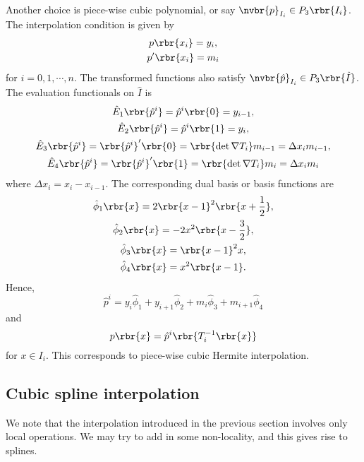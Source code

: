 \documentclass[english, nochinese]{pnote}
\begin{document}
Another choice is piece-wise cubic polynomial, or say $ \nvbr{p}_{I_i} \in P_3 \rbr{I_i} $. The interpolation condition is given by
\begin{gather}
p \rbr{x_i} = y_i, \\
p' \rbr{x_i} = m_i
\end{gather}
for $ i = 0, 1, \cdots, n $. The transformed functions also satisfy $ \nvbr{\hat{p}}_{I_i} \in P_3 \rbr{\hat{I}} $. The evaluation functionals on $\hat{I}$ is
\begin{gather}
\hat{E}_1 \rbr{\hat{p}^i} = \hat{p}^i \rbr{0} = y_{ i - 1 }, \\
\hat{E}_2 \rbr{\hat{p}^i} = \hat{p}^i \rbr{1} = y_i, \\
\hat{E}_3 \rbr{\hat{p}^i} = \rbr{\hat{p}^i}' \rbr{0} = \rbr{ \det \nabla T_i } m_{ i - 1 } = \Delta x_i m_{ i - 1 }, \\
\hat{E}_4 \rbr{\hat{p}^i} = \rbr{\hat{p}^i}' \rbr{1} = \rbr{ \det \nabla T_i } m_i = \Delta x_i m_i
\end{gather}
where $ \Delta x_i = x_i - x_{ i - 1 } $. The corresponding dual basis or basis functions are
\begin{gather}
\hat{\phi}_1 \rbr{x} = 2 \rbr{ x - 1 }^2 \rbr{ x + \frac{1}{2} }, \\
\hat{\phi}_2 \rbr{x} = -2 x^2 \rbr{ x - \frac{3}{2} }, \\
\hat{\phi}_3 \rbr{x} = \rbr{ x - 1 }^2 x, \\
\hat{\phi}_4 \rbr{x} = x^2 \rbr{ x - 1 }.
\end{gather}
Hence,
\begin{equation}
\hat{p}^i = y_i \hat{\phi}_1 + y_{ i + 1 } \hat{\phi}_2 + m_i \hat{\phi}_3 + m_{ i + 1 } \hat{\phi}_4
\end{equation}
and
\begin{equation}
p \rbr{x} = \hat{p}^i \rbr{T_i^{-1} \rbr{x} }
\end{equation}
for $ x \in I_i $. This corresponds to piece-wise cubic Hermite interpolation.

\subsection{Cubic spline interpolation}

We note that the interpolation introduced in the previous section involves only local operations. We may try to add in some non-locality, and this gives rise to splines.
\end{document}
